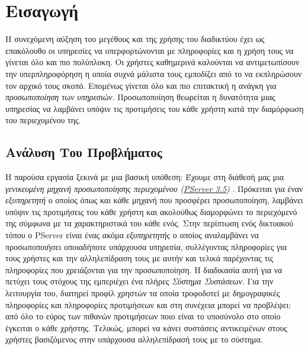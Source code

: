 
\chapter{Εισαγωγή} %

\label{Εισαγωγή} %

\noindent
Η συνεχόμενη αύξηση του μεγέθους και της χρήσης του διαδικτύου έχει ως επακόλουθο
οι υπηρεσίες να υπερφορτώνονται με πληροφορίες και η χρήση τους να γίνεται
όλο και πιο πολύπλοκη. Οι χρήστες καθημερινά καλούνται να αντιμετωπίσουν
την υπερπληροφόρηση η οποία συχνά μάλιστα τους εμποδίζει από το να εκπληρώσουν τον αρχικό τους σκοπό.
Επομένως γίνεται όλο και πιο επιτακτική η ανάγκη για \emph{προσωποποίηση των υπηρεσιών}.
Προσωποποίηση θεωρείται η δυνατότητα μιας υπηρεσίας να λαμβάνει υπόψιν τις προτιμήσεις του κάθε χρήστη 
κατά την διαμόρφωση του περιεχομένου της.

\section{Ανάλυση Του Προβλήματος}
\noindent
Η παρούσα εργασία ξεκινά με μια βασική υπόθεση: Έχουμε στη διάθεσή μας μια \emph{γενικευμένη μηχανή προσωποποίησης περιεχομένου} 
 \emph{(\hyperref[PServer]{PServer 3.5})} .
Πρόκειται για έναν \emph{εξυπηρετητή} ο οποίος όπως και κάθε μηχανή που προσφέρει
προσωποποίηση, λαμβάνει υπόψιν τις προτιμήσεις του κάθε χρήστη και 
ακολούθως διαμορφώνει το περιεχόμενό της σύμφωνα με τα 
χαρακτηριστικά του κάθε ενός.
Στην περίπτωση ενός δικτυακού τόπου ο PServer είναι ένας ακόμα \emph{εξυπηρετητής} 
ο οποίος αναλαμβάνει να προσωποποιήσει οποιαδήποτε υπάρχουσα υπηρεσία,
συλλέγοντας πληροφορίες για τους χρήστες και την αλληλεπίδραση τους με αυτήν και τελικά παρέχοντας τις πληροφορίες που χρειάζονται για την προσωποποίηση. 
Η διαδικασία αυτή για να πετύχει τους στόχους της εμπεριέχει ένα πλήρες \emph{Σύστημα Συστάσεων}. 
Για την λειτουργία του, διατηρεί προφίλ χρηστών τα οποία τροφοδοτεί με δημογραφικές πληροφορίες και πληροφορίες προτιμήσεων και στη συνέχεια μπορεί να προβλέψει: 
από όλο το εύρος των πιθανών προτιμήσεων ποιο είναι το υποσύνολο στο οποίο έγκειται ο κάθε χρήστης. 
Τελικώς, μπορεί να κάνει συστάσεις αντικειμένων στους χρήστες βασιζόμενος στην υπάρχουσα αλληλεπίδρασή τους με το σύστημα.

